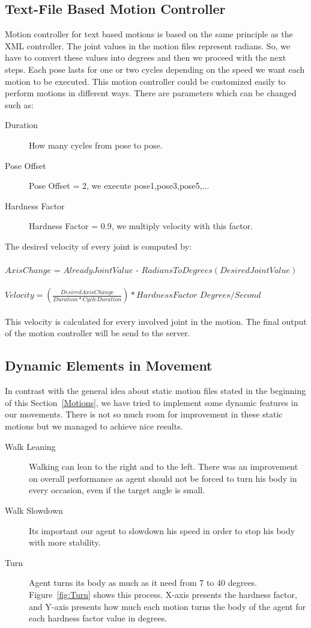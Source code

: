 \subsection{Text-File Based Motion Controller}
Motion controller for text based motions is based on the same principle as the XML controller. The joint values in the motion files represent radians. So, we have to convert these values into degrees and then we proceed with the next steps. Each pose lasts for one or two cycles depending on the speed we want each motion to be executed. This motion controller could be customized easily to perform motions in different ways. There are parameters which can be changed such as:
\begin{description}
	\item[Duration] How many cycles from pose to pose.
	\item[Pose Offset] Pose Offset = 2, we execute pose1,pose3,pose5,...
	\item[Hardness Factor]Hardness Factor = 0.9, we multiply velocity with this factor.
\end{description}
The desired velocity of every joint is computed by:\\
\\
$Axis Change$ = $Already Joint Value$ - $RadiansToDegrees(Desired Joint Value)$
\\
\\
$Velocity = (\frac {Desired Axis Change} {Duration
 \ast CycleDuration})\ast Hardness Factor$ $Degrees/Second$\\
\\
This velocity is calculated for every involved joint in the motion. The final output of the motion controller will be send to the server.

\subsection{Dynamic Elements in Movement}
In contrast with the general idea about static motion files stated in the beginning of this Section~\ref{Motions}, we have tried to implement some dynamic features in our movements. There is not so much room for improvement in these static motions but we managed to achieve nice results.
\begin{description}
	\item[Walk Leaning] Walking can lean to the right and to the left. There was an improvement on overall performance as agent should not be forced to turn his body in every occasion, even if the target angle is small.
	\item[Walk Slowdown] Its important our agent to slowdown his speed in order to stop his body with more stability.
	\item[Turn]	Agent turns its body as much as it need from 7 to 40 degrees. Figure~\ref{fig:Turn} shows this process. X-axis presents the hardness factor, and Y-axis presents how much each motion turns the body of the agent for each hardness factor value in degrees.
\end{description} 


